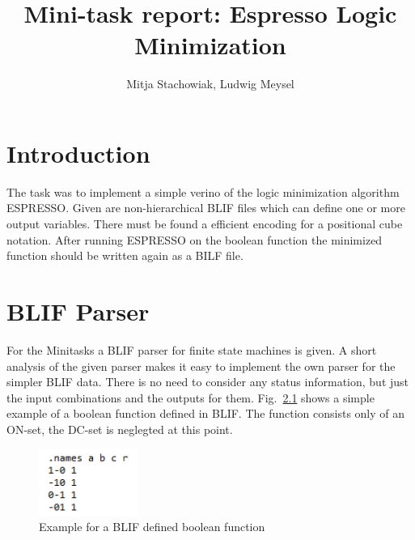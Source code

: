 \documentclass[colorback,accentcolor=tud1c,11pt]{tudreport}
\title{Mini-task report: Espresso Logic Minimization}
\subtitle{Mitja Stachowiak, Ludwig Meysel}
\begin{document}
  \maketitle

  \chapter{Introduction}

  The task was to implement a simple verino of the logic minimization algorithm ESPRESSO. Given are non-hierarchical BLIF files which can define one or more output variables. There must be found a efficient encoding for a positional cube notation. After running ESPRESSO on the boolean function the minimized function should be written again as a BILF file.

  \chapter{BLIF Parser}

  For the Minitasks a BLIF parser for finite state machines is given. A short analysis of the given parser makes it easy to implement the own parser for the simpler BLIF data. There is no need to consider any status information, but just the input combinations and the outputs for them. Fig.~\ref{fig:egblif1} shows a simple example of a boolean function defined in BLIF. The function consists only of an ON-set, the DC-set is neglegted at this point.

  \begin{figure}
	  \centering
	  \includegraphics{img-blif}
	  \caption{Example for a BLIF defined boolean function}
	  \label{fig:egblif1}
  \end{figure}
\end{document}
